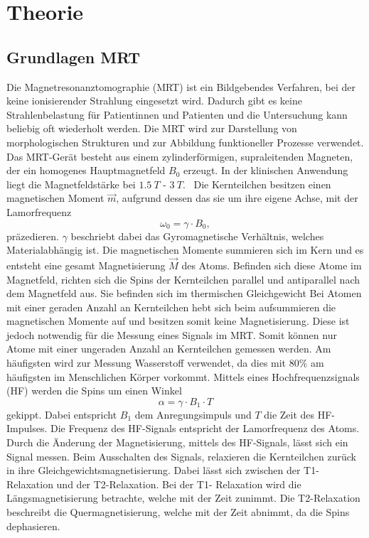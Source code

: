 \chapter{Theorie}

\section{Grundlagen MRT}
Die Magnetresonanztomographie (MRT) ist ein Bildgebendes Verfahren, bei der keine ionisierender Strahlung eingesetzt wird.
Dadurch gibt es keine Strahlenbelastung für Patientinnen und Patienten und die Untersuchung kann beliebig oft wiederholt werden.
Die MRT wird zur Darstellung von morphologischen Strukturen und zur Abbildung funktioneller Prozesse verwendet.
Das MRT-Gerät besteht aus einem zylinderförmigen, supraleitenden Magneten, der ein homogenes Hauptmagnetfeld $B_0$ erzeugt. %
In der klinischen Anwendung liegt die Magnetfeldstärke bei $\qty{1.5}{T}$ - $\qty{3}{T}$.~\cite{Schlegel}
Die Kernteilchen besitzen einen magnetischen Moment $\vec{m}$, aufgrund dessen das sie um ihre eigene Achse, mit der Lamorfrequenz 
\begin{equation}
    \omega_0 = \gamma \cdot B_0,
\end{equation}
präzedieren. $\gamma$ beschriebt dabei das Gyromagnetische Verhältnis, welches Materialabhängig ist.
Die magnetischen Momente summieren sich im Kern und es entsteht eine gesamt Magnetisierung $\vec{M}$ des Atoms. Befinden sich diese Atome im Magnetfeld,
richten sich die Spins der Kernteilchen parallel und antiparallel nach dem Magnetfeld aus. Sie befinden sich im thermischen Gleichgewicht
Bei Atomen mit einer geraden Anzahl an Kernteilchen hebt sich beim aufsummieren die magnetischen Momente auf und besitzen somit keine
Magnetisierung. Diese ist jedoch notwendig für die Messung eines Signals im MRT.
Somit können nur Atome mit einer ungeraden Anzahl an Kernteilchen gemessen werden. 
Am häufigsten wird zur Messung Wasserstoff verwendet, da dies mit 80$\%$ am häufigsten im Menschlichen Körper vorkommt.
Mittels eines Hochfrequenzsignals (HF) werden die Spins um einen Winkel
\begin{equation}
    \alpha = \gamma \cdot B_1 \cdot T 
\end{equation}
gekippt. Dabei entspricht $B_1$ dem Anregungsimpuls und $T$ die Zeit des HF-Impulses.
Die Frequenz des HF-Signals entspricht der Lamorfrequenz des Atoms. 
Durch die Änderung der Magnetisierung, mittels des HF-Signals, lässt sich ein Signal messen. 
Beim Ausschalten des Signals, relaxieren die Kernteilchen zurück in ihre Gleichgewichtsmagnetisierung. 
Dabei lässt sich zwischen der T1-Relaxation und der T2-Relaxation. 
Bei der T1- Relaxation wird die Längsmagnetisierung betrachte, welche mit der Zeit zunimmt.
Die T2-Relaxation beschreibt die Quermagnetisierung, welche mit der Zeit abnimmt, da die Spins dephasieren.~\cite{Pollmann}


